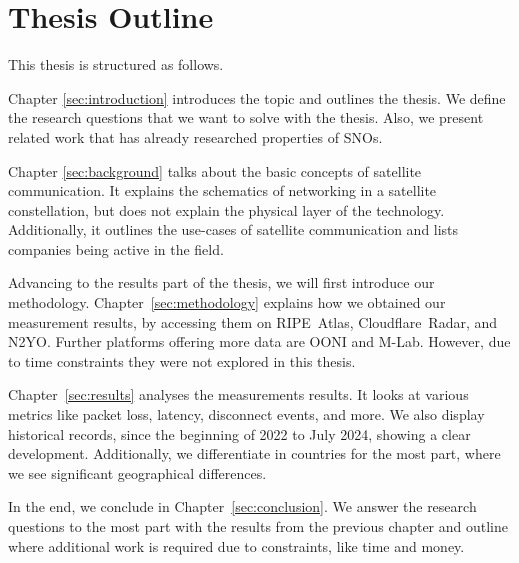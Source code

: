 \section{Thesis Outline}

This thesis is structured as follows.

Chapter \ref{sec:introduction} introduces the topic and outlines the thesis. We
define the research questions that we want to solve with the thesis. Also, we
present related work that has already researched properties of \ac{SNO}s.

Chapter \ref{sec:background} talks about the basic concepts of satellite
communication. It explains the schematics of networking in a satellite
constellation, but does not explain the physical layer of the technology.
Additionally, it outlines the use-cases of satellite communication and lists
companies being active in the field.

Advancing to the results part of the thesis, we will first introduce our
methodology. Chapter~\ref{sec:methodology} explains how we obtained our
measurement results, by accessing them on RIPE~Atlas, Cloudflare~Radar, and
N2YO. Further platforms offering more data are OONI and M-Lab. However, due to
time constraints they were not explored in this thesis.

Chapter~\ref{sec:results} analyses the measurements results. It looks at
various metrics like packet loss, latency, disconnect events, and more. We also
display historical records, since the beginning of 2022 to July 2024, showing a
clear development. Additionally, we differentiate in countries for the most
part, where we see significant geographical differences.

In the end, we conclude in Chapter~\ref{sec:conclusion}. We answer the research
questions to the most part with the results from the previous chapter and
outline where additional work is required due to constraints, like time and
money.
